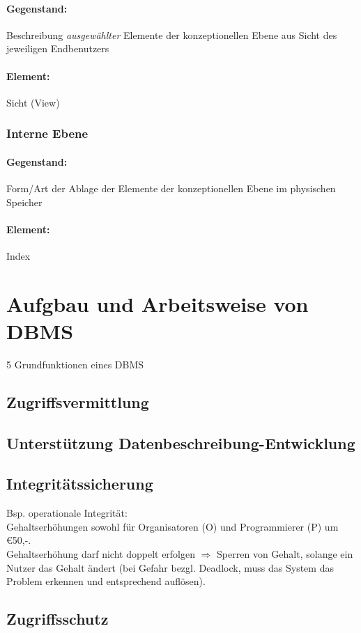 \paragraph{Gegenstand:} Beschreibung \emph{ausgewählter} Elemente der konzeptionellen Ebene aus Sicht des jeweiligen Endbenutzers
\paragraph{Element:} Sicht (View)
\subsubsection{Interne Ebene}
\paragraph{Gegenstand:} Form/Art der Ablage der Elemente der konzeptionellen Ebene im physischen Speicher
\paragraph{Element:} Index

\section{Aufgbau und Arbeitsweise von DBMS}
5 Grundfunktionen eines DBMS
\subsection{Zugriffsvermittlung}
\subsection{Unterstützung Datenbeschreibung-Entwicklung}
\subsection{Integritätssicherung}
Bsp. operationale Integrität:\\
Gehaltserhöhungen sowohl für Organisatoren (O) und Programmierer (P) um \euro{50,-}.\\
Gehaltserhöhung darf nicht doppelt erfolgen $\Rightarrow$ Sperren von Gehalt, solange ein Nutzer das Gehalt ändert (bei Gefahr bezgl. Deadlock, muss das System das Problem erkennen und entsprechend auflösen).
\subsection{Zugriffsschutz}
